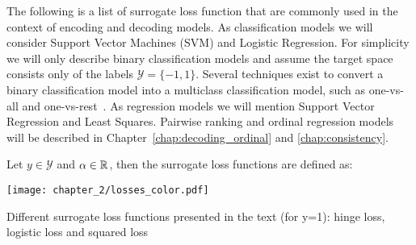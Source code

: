 The following is a list of surrogate loss function that are commonly used in the context of encoding and decoding models. As classification models we will consider Support Vector Machines (SVM) and Logistic Regression. For simplicity we will only describe binary classification models and assume the target space consists only of the labels $\mathcal{Y} = \{-1, 1\}$. Several techniques exist to convert a binary classification model into a multiclass classification model, such as one-vs-all and one-vs-rest~\citep{bishop2006pattern}. As regression models we will mention Support Vector Regression and Least Squares. Pairwise ranking and ordinal regression models will be described in Chapter~\ref{chap:decoding_ordinal} and \ref{chap:consistency}. 

Let $y \in \mathcal{Y}$ and $\alpha \in {\mathbb R}$, then the surrogate loss functions are defined as:



\begin{marginfigure}
\texttt{[image: chapter\_2/losses\_color.pdf]}
\caption{Different surrogate loss functions presented in the text (for y=1): hinge loss, logistic loss and squared loss}
\end{marginfigure}


